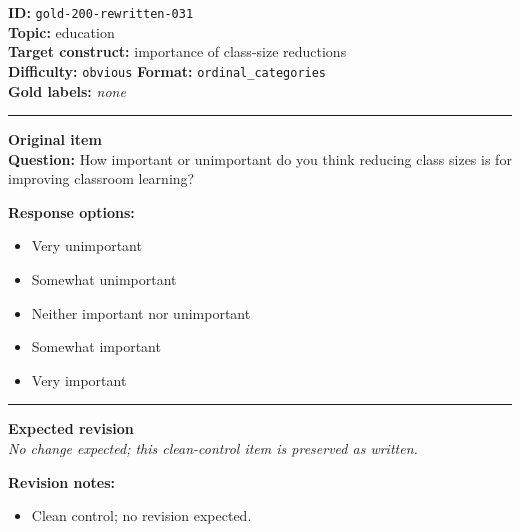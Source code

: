 \documentclass[10pt,a4paper]{article}
\newcommand{\sectionline}{\vspace{0.15em}\hrule\vspace{0.35em}}
\begin{document}
\begin{tcolorbox}[colframe=CleanGreen,colback=white,colbacktitle=CleanGreen!9,coltitle=black,title={Item 031\hfill Clean control}]
\textbf{ID:} \texttt{gold-200-rewritten-031}\\
\textbf{Topic:} education\\
\textbf{Target construct:} importance of class-size reductions\\
\textbf{Difficulty:} \texttt{obvious} \quad \textbf{Format:} \texttt{ordinal\_categories}\\
\textbf{Gold labels:} \textit{none}\\
\sectionline
\textbf{Original item}\\
\textbf{Question:} How important or unimportant do you think reducing class sizes is for improving classroom learning?
\par\textbf{Response options:}
\begin{itemize}
\item Very unimportant
\item Somewhat unimportant
\item Neither important nor unimportant
\item Somewhat important
\item Very important
\end{itemize}
\sectionline
\textbf{Expected revision}\\
\textit{No change expected; this clean-control item is preserved as written.}
\par\textbf{Revision notes:}
\begin{itemize}
\item Clean control; no revision expected.
\end{itemize}
\end{tcolorbox}
\end{document}
